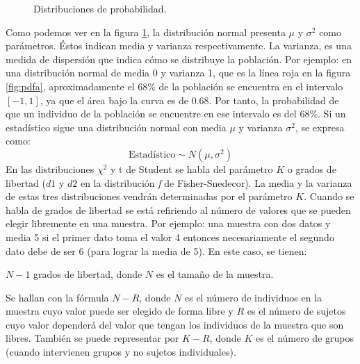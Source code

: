 \begin{figure}[h]
\centering
{}
\caption{Distribuciones de probabilidad.}
\label{fig:pdf}
\end{figure}
\newline
Como podemos ver en la figura \ref{fig:pdf}, la distribución normal presenta $\mu$ y $\sigma^2$ como parámetros.
Éstos indican media y varianza respectivamente. La varianza, es una medida de dispersión que indica cómo se
distribuye la población. Por ejemplo: en una distribución normal de media 0 y varianza 1, que es la línea roja
en la figura \ref{fig:pdfa}, aproximadamente el $68\%$ de la población se encuentra en el intervalo $[-1,1]$,
ya que el área bajo la curva es de 0.68. Por tanto, la probabilidad de que un individuo de la población se
encuentre en ese intervalo es del 68\%. Si un estadístico sigue una distribución normal con media $\mu$ y
varianza $\sigma^2$, se expresa como:
\[ \mbox{Estadístico} \sim N(\mu,\sigma^2) \]
En las distribuciones $\chi^2$ y t de Student se habla del parámetro $K$ o grados de libertad ($d1$ y $d2$  en
la distribución \textit{f} de Fisher-Snedecor). La media y la varianza de estas tres distribuciones vendrán determinadas por
el parámetro $K$. Cuando se habla de grados de libertad se está refiriendo al número de valores que se pueden elegir
libremente en una muestra. Por ejemplo: una muestra con dos datos y media 5 si el primer dato toma el valor 4 entonces
necesariamente el segundo dato debe de ser 6 (para lograr la media de 5). En este caso, se tienen:
\begin{center}
$N - 1$ grados de libertad, donde $N$ es el tamaño de la muestra.
\end{center}
Se hallan con la fórmula $N-R$, donde $N$ es el número de individuos en la muestra cuyo valor puede ser elegido de
forma libre y $R$ es el número de sujetos cuyo valor dependerá del valor que tengan los individuos de la muestra que
son libres. También se puede representar por $K-R$, donde $K$ es el número de grupos (cuando intervienen grupos y
no sujetos individuales).

